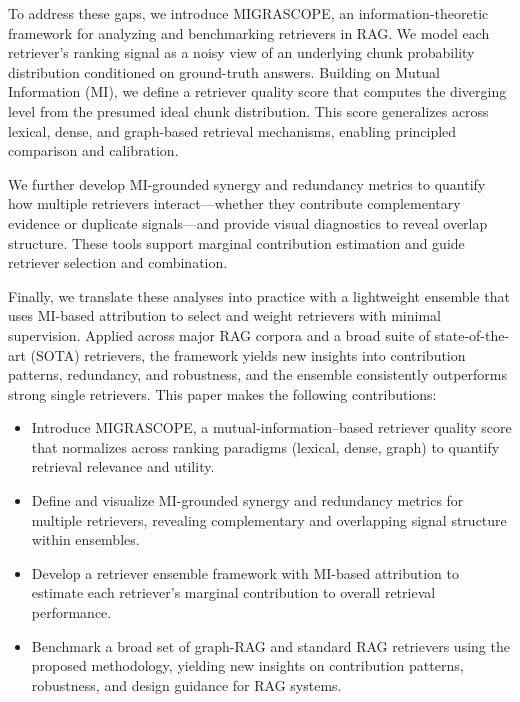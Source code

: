 \documentclass{article}
\theoremstyle{plain}
\theoremstyle{definition}
\theoremstyle{remark}
\begin{document}

To address these gaps, we introduce MIGRASCOPE, an information-theoretic framework for analyzing and benchmarking retrievers in RAG. We model each retriever’s ranking signal as a noisy view of an underlying chunk probability distribution conditioned on ground-truth answers. Building on Mutual Information (MI), we define a retriever quality score that computes the diverging level from the presumed ideal chunk distribution. This score generalizes across lexical, dense, and graph-based retrieval mechanisms, enabling principled comparison and calibration.

We further develop MI-grounded synergy and redundancy metrics to quantify how multiple retrievers interact—whether they contribute complementary evidence or duplicate signals—and provide visual diagnostics to reveal overlap structure. These tools support marginal contribution estimation and guide retriever selection and combination.

Finally, we translate these analyses into practice with a lightweight ensemble that uses MI-based attribution to select and weight retrievers with minimal supervision. Applied across major RAG corpora and a broad suite of state-of-the-art (SOTA) retrievers, the framework yields new insights into contribution patterns, redundancy, and robustness, and the ensemble consistently outperforms strong single retrievers. This paper makes the following contributions:

\begin{itemize}
\item Introduce MIGRASCOPE, a mutual-information–based retriever quality score that normalizes across ranking paradigms (lexical, dense, graph) to quantify retrieval relevance and utility.
\item Define and visualize MI-grounded synergy and redundancy metrics for multiple retrievers, revealing complementary and overlapping signal structure within ensembles.
\item Develop a retriever ensemble framework with MI-based attribution to estimate each retriever’s marginal contribution to overall retrieval performance.
\item Benchmark a broad set of graph-RAG and standard RAG retrievers using the proposed methodology, yielding new insights on contribution patterns, robustness, and design guidance for RAG systems.
\end{itemize}
\end{document}
